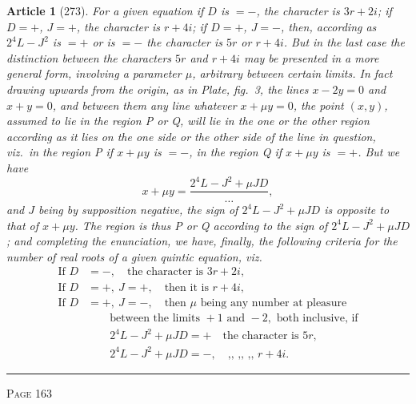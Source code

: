 \documentclass[11pt,a4paper]{article}
\theoremstyle{cayley}
\newtheorem{art}{Article}
\begin{document}
\begin{art}[273]
For a given equation if $D$ is $=-$, the character is $3r+2i$; if $D=+$, $J=+$, the character is $r+4i$; if $D=+$, $J=-$, then, according as $2^4L - J^2$ is $=+$ or is $=-$ the character is $5r$ or $r+4i$. But in the last case the distinction between the characters $5r$ and $r+4i$ may be presented in a more general form, involving a parameter $\mu$, arbitrary between certain limits. In fact drawing upwards from the origin, as in Plate, fig.~3, the lines $x-2y=0$ and $x+y=0$, and between them any line whatever $x+\mu y = 0$, the point $(x, y)$, assumed to lie in the region P or Q, will lie in the one or the other region according as it lies on the one side or the other side of the line in question, viz.\ in the region P if $x+\mu y$ is $=-$, in the region Q if $x+\mu y$ is $=+$. But we have
\[
x + \mu y = \frac{2^4L - J^2 + \mu JD}{\dots},
\]
and $J$ being by supposition negative, the sign of $2^4L - J^2 + \mu JD$ is opposite to that of $x+\mu y$. The region is thus P or Q according to the sign of $2^4L - J^2 + \mu JD$; and completing the enunciation, we have, finally, the following criteria for the number of real roots of a given quintic equation, viz.
\begin{align*}
\text{If } D &= -, \quad\text{the character is } 3r+2i, \\
\text{If } D &= +,\ J = +, \quad\text{then it is } r+4i, \\
\text{If } D &= +,\ J = -, \quad\text{then } \mu \text{ being any number at pleasure}\\
&\qquad\text{between the limits } +1 \text{ and } -2, \text{ both inclusive, if} \\
&\qquad 2^4L - J^2 + \mu JD = + \quad\text{the character is } 5r, \\
&\qquad 2^4L - J^2 + \mu JD = -, \quad\text{,, ,, ,, } r+4i.
\end{align*}
\end{art}

\vspace{1em}
\noindent\rule{\textwidth}{0.4pt}
\begin{center}\textsc{Page 163}\end{center}
\newpage
\end{document}
